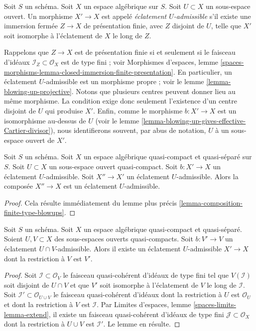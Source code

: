 \begin{definition}
\label{definition-admissible-blowup}
Soit $S$ un schéma. Soit $X$ un espace algébrique sur $S$.
Soit $U \subset X$ un sous-espace ouvert. Un morphisme
$X' \to X$ est appelé {\it éclatement $U$-admissible} s'il existe une
immersion fermée $Z \to X$ de présentation finie, avec $Z$ disjoint de
$U$, telle que $X'$ soit isomorphe à l'éclatement de $X$ le long de $Z$.
\end{definition}

\noindent
Rappelons que $Z \to X$ est de présentation finie si et seulement si le
faisceau d'idéaux $\mathcal{I}_Z \subset \mathcal{O}_X$ est de type fini ; voir
Morphismes d'espaces, lemme
\ref{spaces-morphisms-lemma-closed-immersion-finite-presentation}.
En particulier, un éclatement $U$-admissible est un morphisme propre ; voir le
lemme \ref{lemma-blowing-up-projective}.
Notons que plusieurs centres peuvent donner lieu au même morphisme.
La condition exige donc seulement l'existence d'un centre disjoint de
$U$ qui produise $X'$.
Enfin, comme le morphisme $b : X' \to X$ est un isomorphisme au-dessus de $U$ (voir le
lemme \ref{lemma-blowing-up-gives-effective-Cartier-divisor}), nous identifierons souvent,
par abus de notation, $U$ à un sous-espace ouvert de $X'$.

\begin{lemma}
\label{lemma-composition-admissible-blowups}
Soit $S$ un schéma.
Soit $X$ un espace algébrique quasi-compact et quasi-séparé sur $S$.
Soit $U \subset X$ un sous-espace ouvert quasi-compact.
Soit $b : X' \to X$ un éclatement $U$-admissible.
Soit $X'' \to X'$ un éclatement $U$-admissible.
Alors la composée $X'' \to X$ est un éclatement $U$-admissible.
\end{lemma}

\begin{proof}
Cela résulte immédiatement du
lemme plus précis \ref{lemma-composition-finite-type-blowups}.
\end{proof}

\begin{lemma}
\label{lemma-extend-admissible-blowups}
Soit $S$ un schéma.
Soit $X$ un espace algébrique quasi-compact et quasi-séparé.
Soient $U, V \subset X$ des sous-espaces ouverts quasi-compacts.
Soit $b : V' \to V$ un éclatement $U \cap V$-admissible.
Alors il existe un éclatement $U$-admissible $X' \to X$
dont la restriction à $V$ est $V'$.
\end{lemma}

\begin{proof}
Soit $\mathcal{I} \subset \mathcal{O}_V$ le faisceau quasi-cohérent d'idéaux
de type fini tel que $V(\mathcal{I})$ soit
disjoint de $U \cap V$ et que $V'$ soit isomorphe à
l'éclatement de $V$ le long de $\mathcal{I}$. Soit
$\mathcal{I}' \subset \mathcal{O}_{U \cup V}$ le faisceau quasi-cohérent
d'idéaux dont la restriction à $U$ est $\mathcal{O}_U$ et
dont la restriction à $V$ est $\mathcal{I}$.
Par Limites d'espaces, lemme \ref{spaces-limits-lemma-extend},
il existe un faisceau quasi-cohérent d'idéaux de type fini
$\mathcal{J} \subset \mathcal{O}_X$ dont la restriction à $U \cup V$ est
$\mathcal{I}'$. Le lemme en résulte.
\end{proof}

